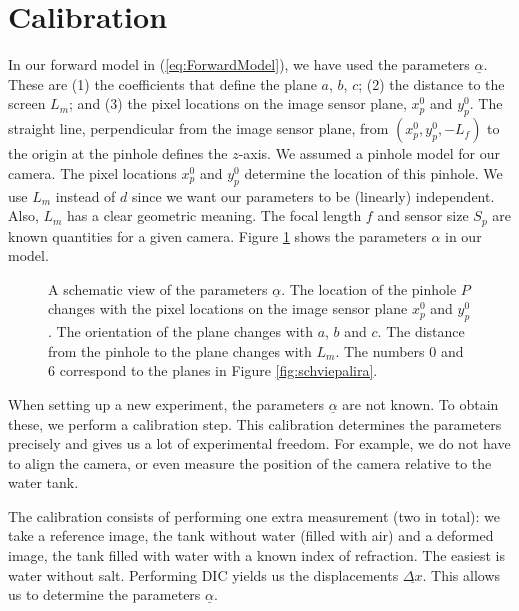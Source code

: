 \documentclass{svjour3}                     %
\begin{document}
\section{Calibration}
\label{sec:cal}
In our forward model in (\ref{eq:ForwardModel}), we have used the parameters $\underline{\alpha}$. These are (1) the coefficients that define the plane $a$, $b$, $c$; (2) the distance to the screen $L_m$; and (3)  the pixel locations on the image sensor plane, $x_p^0$ and $y_p^0$. The straight line, perpendicular from the image sensor plane, from $(x_p^0, y_p^0, -L_f)$ to the origin at the pinhole defines the $z$-axis. We assumed a pinhole model for our camera. The pixel locations $x_p^0$ and $y_p^0$ determine the location of this pinhole.  We use $L_m$ instead of $d$ since we want our parameters to be (linearly) independent. Also, $L_m$ has a clear geometric meaning. The focal length $f$ and sensor size $S_p$ are known quantities for a given camera. Figure \ref{fig:calpar} shows the parameters $\alpha$ in our model.

\begin{figure}[hpbt]
	
	\caption{A schematic view of the parameters $\underline{\alpha}$. The location of the pinhole $P$ changes with the pixel locations on the image sensor plane $x_p^0$ and $y_p^0$. The orientation of the plane changes with $a$, $b$ and $c$. The distance from the pinhole to the plane changes with $L_m$. The numbers $0$ and $6$ correspond to the planes in Figure \ref{fig:schviepalira}.}	
\label{fig:calpar}	
\end{figure}

When setting up a new experiment, the parameters $\underline{\alpha}$ are not known. To obtain these, we perform a calibration step. This calibration determines the parameters precisely and gives us a lot of experimental freedom. For example, we do not have to align the camera, or even measure the position of the camera relative to the water tank.

The calibration consists of performing one extra measurement (two in total): we take a reference image, the tank without water (filled with air) and a deformed image, the tank filled with water with a known index of refraction. The easiest is water without salt. Performing DIC yields us the displacements $\underline{\Delta x}$. This allows us to determine the parameters $\underline{\alpha}.$
\end{document}
